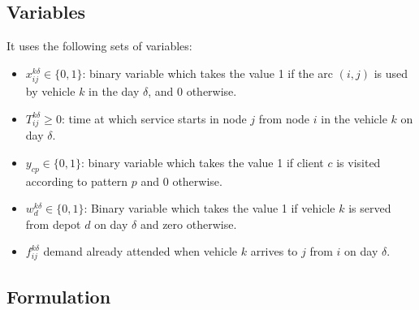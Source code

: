 \documentclass[preprint,review,12pt]{elsarticle}
\begin{document}
\subsection{Variables}
It uses the following sets of variables:

\begin{itemize}
	\item  $x_{ij}^{k\delta}  \in  \{ 0,1 \}$: binary variable which takes the value 1 if the arc $(i,j)$ is used by vehicle $k$ in the day $\delta$, and 0 otherwise. 
	\item $T_{ij}^{k\delta} \geq 0$: time at which service starts in node $j$ from node $i$ in the vehicle $k$ on day $\delta$. 
	\item $y_{cp} \in  \{ 0,1 \}$: binary variable which takes the value 1 if client $c$ is visited according to pattern $p$ and 0 otherwise.
	\item  $w_d^{k\delta} \in  \{0,1\}$: Binary variable which takes the value 1 if vehicle $k$ is served from depot $d$ on day $\delta$ and zero otherwise.
	\item $f_{ij}^{k\delta}$ demand already attended when vehicle $k$ arrives to $j$ from $i$ on day $\delta$.
\end{itemize}

\subsection{Formulation}
\end{document}
